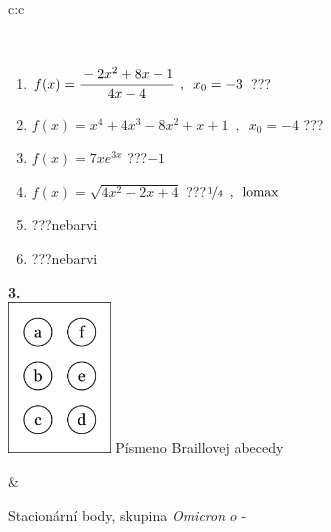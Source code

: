 \documentclass[10pt]{report}
\newcommand\omicron{o}
\begin{document}
\begin{tabular}{c:c}
\begin{minipage}[c][104.5mm][t]{0.5\linewidth}
\begin{center}
\begin{minipage}{0.95\linewidth}
\begin{center}
\end{center}
\end{minipage}
\\[1mm]
\begin{minipage}{0.79\linewidth}
\begin{center}
\begin{varwidth}{\linewidth}
\begin{enumerate}
\normalsize
\item $f(x)=\cfrac{-2x^2+8x-1}{4x-4}\enspace , \enspace x_0=-3$\quad \dotfill\; ???\;\dotfill \quad {}
\item $f(x)=x^4+4x^3-8x^2+x+1\enspace , \enspace x_0=-4$\quad \dotfill\; ???\;\dotfill \quad {}
\item $f(x)=7xe^{3x}$\quad \dotfill\; ???\;\dotfill \quad $-1$
\item $f(x)=\sqrt{4x^2-2x+4}$\quad \dotfill\; ???\;\dotfill \quad $\nicefrac{1}{4}\enspace , \enspace\mathrm{lomax}$
\item \quad \dotfill\; ???\;\dotfill \quad nebarvi
\item \quad \dotfill\; ???\;\dotfill \quad nebarvi
\end{enumerate}
\end{varwidth}
\end{center}
\end{minipage}
\begin{minipage}{0.20\linewidth}
\begin{center}
{\Huge\bfseries 3.} \\[2mm]
\includegraphics[height=40mm]{../images/braille.png}
{\small Písmeno Braillovej abecedy}
\end{center}
\end{minipage}
\end{center}
\end{minipage}
&
\begin{minipage}[c][104.5mm][t]{0.5\linewidth}
\begin{center}
\vspace{7mm}
{\huge Stacionární body, skupina \textit{Omicron $\omicron$} -}\\[5mm]

\end{center}
\end{minipage}
\end{tabular}
\end{document}
